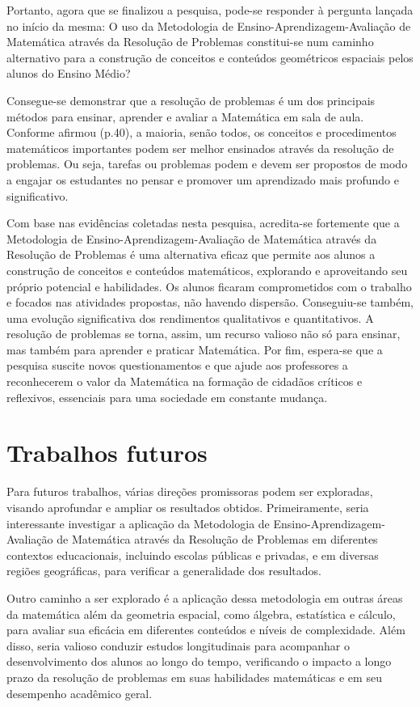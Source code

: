 Portanto, agora que se finalizou a pesquisa, pode-se responder à pergunta lançada no início da mesma: O uso da Metodologia de Ensino-Aprendizagem-Avaliação de Matemática através da Resolução de Problemas constitui-se num caminho alternativo para a construção de conceitos e conteúdos geométricos espaciais pelos alunos do Ensino Médio?

Consegue-se demonstrar que a resolução de problemas é um dos principais métodos para ensinar, aprender e avaliar a Matemática em sala de aula. Conforme afirmou  (p.40), a maioria, senão todos, os conceitos e procedimentos matemáticos importantes podem ser melhor ensinados através da resolução de problemas. Ou seja, tarefas ou problemas podem e devem ser propostos de modo a engajar os estudantes no pensar e promover um aprendizado mais profundo e significativo.

Com base nas evidências coletadas nesta pesquisa, acredita-se fortemente que a Metodologia de Ensino-Aprendizagem-Avaliação de Matemática através da Resolução de Problemas é uma alternativa eficaz que permite aos alunos a construção de conceitos e conteúdos matemáticos, explorando e aproveitando seu próprio potencial e habilidades. Os alunos ficaram comprometidos com o trabalho e focados nas atividades propostas, não havendo dispersão. Conseguiu-se também, uma evolução significativa dos rendimentos qualitativos e quantitativos. A resolução de problemas se torna, assim, um recurso valioso não só para ensinar, mas também para aprender e praticar Matemática. Por fim, espera-se que a pesquisa suscite novos questionamentos e que ajude aos professores a reconhecerem o valor da Matemática na formação de cidadãos críticos e reflexivos, essenciais para uma sociedade em constante mudança.

\section{Trabalhos futuros}

Para futuros trabalhos, várias direções promissoras podem ser exploradas, visando aprofundar e ampliar os resultados obtidos. Primeiramente, seria interessante investigar a aplicação da Metodologia de Ensino-Aprendizagem-Avaliação de Matemática através da Resolução de Problemas em diferentes contextos educacionais, incluindo escolas públicas e privadas, e em diversas regiões geográficas, para verificar a generalidade dos resultados.

Outro caminho a ser explorado é a aplicação dessa metodologia em outras áreas da matemática além da geometria espacial, como álgebra, estatística e cálculo, para avaliar sua eficácia em diferentes conteúdos e níveis de complexidade. Além disso, seria valioso conduzir estudos longitudinais para acompanhar o desenvolvimento dos alunos ao longo do tempo, verificando o impacto a longo prazo da resolução de problemas em suas habilidades matemáticas e em seu desempenho acadêmico geral.

